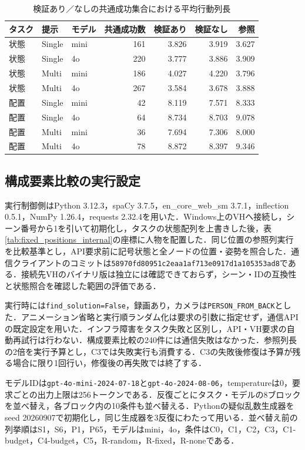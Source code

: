 \begin{table}[tb]
\caption{検証あり／なしの共通成功集合における平均行動列長}\label{tab:common_success_internal}
\centering\small
\setlength{\tabcolsep}{3pt}
\begin{tabular}{lllrrrr}
\hline
タスク & 提示 & モデル & 共通成功数 & 検証あり & 検証なし & 参照 \\
\hline
状態 & Single & mini & 161 & 3.826 & 3.919 & 3.627 \\
状態 & Single & 4o & 220 & 3.777 & 3.886 & 3.909 \\
状態 & Multi & mini & 186 & 4.027 & 4.220 & 3.796 \\
状態 & Multi & 4o & 267 & 3.584 & 3.678 & 3.888 \\
配置 & Single & mini & 42 & 8.119 & 7.571 & 8.333 \\
配置 & Single & 4o & 64 & 8.734 & 8.703 & 9.078 \\
配置 & Multi & mini & 36 & 7.694 & 7.306 & 8.000 \\
配置 & Multi & 4o & 78 & 8.872 & 8.397 & 9.346 \\
\hline
\end{tabular}
\end{table}

\subsection{構成要素比較の実行設定}\label{app:execution_conditions}
実行制御側はPython 3.12.3，spaCy 3.7.5，en\_core\_web\_sm 3.7.1，inflection 0.5.1，NumPy 1.26.4，requests 2.32.4を用いた．Windows上のVHへ接続し，シーン番号から1を引いて初期化し，タスクの状態配列を上書きした後，表\ref{tab:fixed_positions_internal}の座標に人物を配置した．同じ位置の参照列実行を比較基準とし，API要求前に記号状態と全ノードの位置・姿勢を照合した．通信クライアントのコミットは\texttt{58970fd80951c2eaa1af713e0917d1a105353ad8}である．接続先VHのバイナリ版は独立には確認できておらず，シーン・IDの互換性と状態照合を確認した範囲の評価である．

実行時には\texttt{find\_solution=False}，録画あり，カメラは\texttt{PERSON\_FROM\_BACK}とした．アニメーション省略と実行順ランダム化は要求の引数に指定せず，通信APIの既定設定を用いた．インフラ障害をタスク失敗と区別し，API・VH要求の自動再試行は行わない．構成要素比較の240件には通信失敗はなかった．参照列長の2倍を実行予算とし，C3では失敗実行も消費する．C3の失敗後修復は予算が残る場合に限り1回行い，修復後の再失敗では終了する．

モデルIDは\texttt{gpt-4o-mini-2024-07-18}と\texttt{gpt-4o-2024-08-06}，temperatureは0，要求ごとの出力上限は256トークンである．反復ごとにタスク・モデルの8ブロックを並べ替え，各ブロック内の10条件も並べ替える．Pythonの疑似乱数生成器をseed 20260907で初期化し，同じ生成器を3反復にわたって用いる．並べ替え前の列挙順はS1，S6，P1，P65，モデルはmini，4o，条件はC0，C1，C2，C3，C1-budget，C4-budget，C5，R-random，R-fixed，R-noneである．

